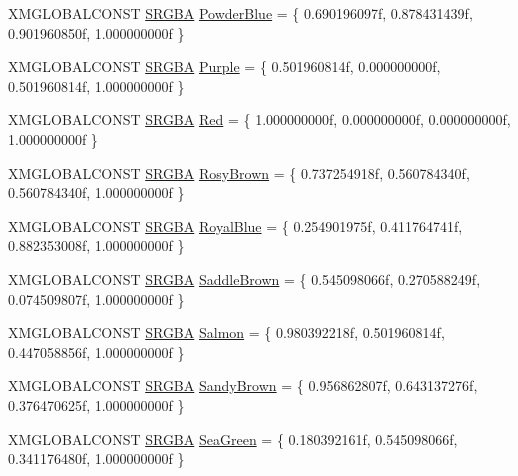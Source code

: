 \begin{DoxyCompactItemize}
\item 
X\+M\+G\+L\+O\+B\+A\+L\+C\+O\+N\+ST \hyperlink{structmage_1_1_s_r_g_b_a}{S\+R\+G\+BA} \hyperlink{namespacemage_1_1color_ac75f12ee461424dff5a031dfee8fe73b}{Powder\+Blue} = \{ 0.\+690196097f, 0.\+878431439f, 0.\+901960850f, 1.\+000000000f \}
\item 
X\+M\+G\+L\+O\+B\+A\+L\+C\+O\+N\+ST \hyperlink{structmage_1_1_s_r_g_b_a}{S\+R\+G\+BA} \hyperlink{namespacemage_1_1color_a6466ea355a9d92403093523e4f9c7e6f}{Purple} = \{ 0.\+501960814f, 0.\+000000000f, 0.\+501960814f, 1.\+000000000f \}
\item 
X\+M\+G\+L\+O\+B\+A\+L\+C\+O\+N\+ST \hyperlink{structmage_1_1_s_r_g_b_a}{S\+R\+G\+BA} \hyperlink{namespacemage_1_1color_a8832bac671d8a6ebbce6edc3c0289ada}{Red} = \{ 1.\+000000000f, 0.\+000000000f, 0.\+000000000f, 1.\+000000000f \}
\item 
X\+M\+G\+L\+O\+B\+A\+L\+C\+O\+N\+ST \hyperlink{structmage_1_1_s_r_g_b_a}{S\+R\+G\+BA} \hyperlink{namespacemage_1_1color_a4d29d760cc914eb93aef64c4d7bdc530}{Rosy\+Brown} = \{ 0.\+737254918f, 0.\+560784340f, 0.\+560784340f, 1.\+000000000f \}
\item 
X\+M\+G\+L\+O\+B\+A\+L\+C\+O\+N\+ST \hyperlink{structmage_1_1_s_r_g_b_a}{S\+R\+G\+BA} \hyperlink{namespacemage_1_1color_a89c20a091fb4e7ae8ab9a4e57eec461c}{Royal\+Blue} = \{ 0.\+254901975f, 0.\+411764741f, 0.\+882353008f, 1.\+000000000f \}
\item 
X\+M\+G\+L\+O\+B\+A\+L\+C\+O\+N\+ST \hyperlink{structmage_1_1_s_r_g_b_a}{S\+R\+G\+BA} \hyperlink{namespacemage_1_1color_a20a5cad46b0eda1bc5e1cdfe3df36498}{Saddle\+Brown} = \{ 0.\+545098066f, 0.\+270588249f, 0.\+074509807f, 1.\+000000000f \}
\item 
X\+M\+G\+L\+O\+B\+A\+L\+C\+O\+N\+ST \hyperlink{structmage_1_1_s_r_g_b_a}{S\+R\+G\+BA} \hyperlink{namespacemage_1_1color_ac05f0e6236580b710313e3d965ba8921}{Salmon} = \{ 0.\+980392218f, 0.\+501960814f, 0.\+447058856f, 1.\+000000000f \}
\item 
X\+M\+G\+L\+O\+B\+A\+L\+C\+O\+N\+ST \hyperlink{structmage_1_1_s_r_g_b_a}{S\+R\+G\+BA} \hyperlink{namespacemage_1_1color_af4d1507b2bcd178ac7195ae4e053075c}{Sandy\+Brown} = \{ 0.\+956862807f, 0.\+643137276f, 0.\+376470625f, 1.\+000000000f \}
\item 
X\+M\+G\+L\+O\+B\+A\+L\+C\+O\+N\+ST \hyperlink{structmage_1_1_s_r_g_b_a}{S\+R\+G\+BA} \hyperlink{namespacemage_1_1color_a2589b32d7aeb0866ac1e9dc06979cf54}{Sea\+Green} = \{ 0.\+180392161f, 0.\+545098066f, 0.\+341176480f, 1.\+000000000f \}
\item 

\end{DoxyCompactItemize}

